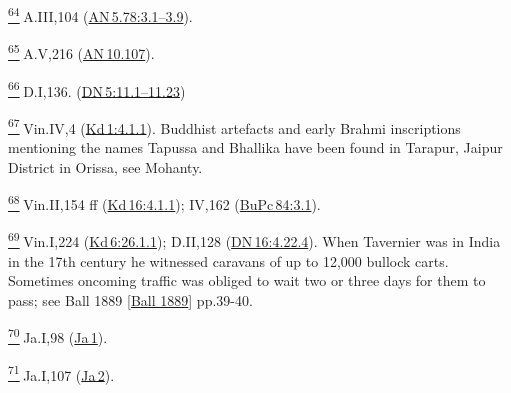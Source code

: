 \label{footprints_split_024.html_fn64}
\hyperref[footprints_split_006.htmlux5cux23fnref64]{\textsuperscript{64}} A.III,104
(\href{https://suttacentral.net/an5.78/en/sujato\#3.1}{AN\,5.78:3.1--3.9}).

\label{footprints_split_024.html_fn65}
\hyperref[footprints_split_006.htmlux5cux23fnref65]{\textsuperscript{65}} A.V,216
(\href{https://suttacentral.net/an10.107/en/sujato}{AN\,10.107}).

\label{footprints_split_024.html_fn66}
\hyperref[footprints_split_006.htmlux5cux23fnref66]{\textsuperscript{66}} D.I,136.
(\href{https://suttacentral.net/dn5/en/sujato\#11.1}{DN\,5:11.1--11.23})

\label{footprints_split_024.html_fn67}
\hyperref[footprints_split_006.htmlux5cux23fnref67]{\textsuperscript{67}} Vin.IV,4
(\href{https://suttacentral.net/pli-tv-kd1/en/brahmali\#4.1.1}{Kd\,1:4.1.1}).
Buddhist artefacts and early Brahmi inscriptions mentioning the names
Tapussa and Bhallika have been found in Tarapur, Jaipur District in
Orissa, see Mohanty.

\label{footprints_split_024.html_fn68}
\hyperref[footprints_split_006.htmlux5cux23fnref68]{\textsuperscript{68}} Vin.II,154
ff
(\href{https://suttacentral.net/pli-tv-kd16/en/brahmali\#4.1.1}{Kd\,16:4.1.1});
IV,162
(\href{https://suttacentral.net/pli-tv-bu-vb-pc84/en/brahmali\#3.1}{BuPc\,84:3.1}).

\label{footprints_split_024.html_fn69}
\hyperref[footprints_split_006.htmlux5cux23fnref69]{\textsuperscript{69}} Vin.I,224
(\href{https://suttacentral.net/pli-tv-kd6/en/brahmali\#26.1.1}{Kd\,6:26.1.1});
D.II,128
(\href{https://suttacentral.net/dn16/en/sujato\#4.22.4}{DN\,16:4.22.4}).
When Tavernier was in India in the 17{th} century he witnessed caravans
of up to 12,000 bullock carts. Sometimes oncoming traffic was obliged to
wait two or three days for them to pass; see {Ball 1889
{{[}\hyperref[footprints_split_023.htmlux5cux23Ballux5cux25201889]{Ball
1889}{]}}} pp.39-40.

\label{footprints_split_024.html_fn70}
\hyperref[footprints_split_006.htmlux5cux23fnref70]{\textsuperscript{70}} Ja.I,98
(\href{https://suttacentral.net/ja1}{Ja\,1}).

\label{footprints_split_024.html_fn71}
\hyperref[footprints_split_006.htmlux5cux23fnref71]{\textsuperscript{71}} Ja.I,107
(\href{https://suttacentral.net/ja2}{Ja\,2}).

